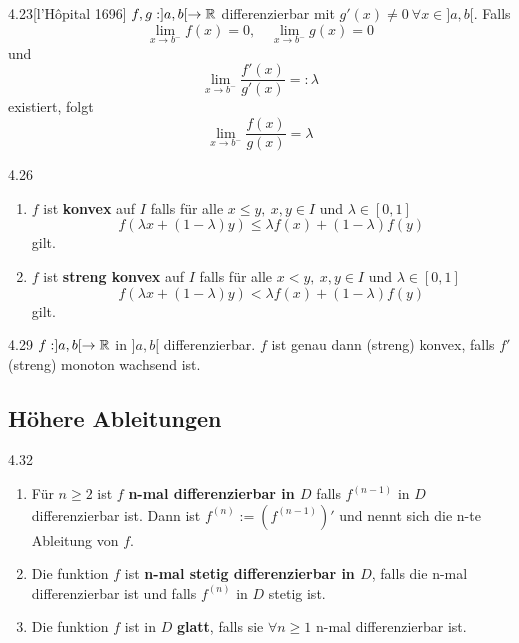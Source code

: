 \begin{satz}{4.23}[l'Hôpital 1696]
    $f,g: ]a, b[ \to \mathbb{R}$ differenzierbar mit $g'(x) \ne 0\ \forall x \in ]a, b[$.
    Falls
    \[ \lim_{x \to b^-} f(x) = 0,\quad \lim_{x \to b^-} g(x) = 0 \]
    und
    \[ \lim_{x \to b^-} \frac{f'(x)}{g'(x)} =: \lambda \]
    existiert, folgt
    \[ \lim_{x \to b^-} \frac{f(x)}{g(x)} = \lambda \]
\end{satz}

\begin{definition}{4.26}
    \begin{enumerate}
        \item $f$ ist \textbf{konvex} auf $I$ falls für alle $x \le y,\ x,y \in I$ und $\lambda \in [0,1]$
              \[ f(\lambda x + (1 - \lambda)y) \le \lambda f(x) + (1 - \lambda)f(y) \]
              gilt.
        \item $f$ ist \textbf{streng konvex} auf $I$ falls für alle $x < y,\ x,y \in I$ und $\lambda \in [0,1]$
              \[ f(\lambda x + (1 - \lambda)y) < \lambda f(x) + (1 - \lambda)f(y) \]
              gilt.
    \end{enumerate}
\end{definition}

\begin{satz}{4.29}
    $f: ]a, b[ \to \mathbb{R}$ in $]a, b[$ differenzierbar. $f$ ist genau dann (streng) konvex, falls $f'$ (streng) monoton wachsend ist.
\end{satz}

\subsection{Höhere Ableitungen}

\begin{definition}{4.32}
    \begin{enumerate}
        \item Für $n \ge 2$ ist $f$ \textbf{n-mal differenzierbar in $D$} falls $f^{(n-1)}$ in $D$ differenzierbar ist.
              Dann ist $f^(n) := (f^{(n - 1)})'$ und nennt sich die n-te Ableitung von $f$.
        \item Die funktion $f$ ist \textbf{n-mal stetig differenzierbar in $D$}, falls die n-mal differenzierbar ist und falls $f^{(n)}$ in $D$ stetig ist.
        \item Die funktion $f$ ist in $D$ \textbf{glatt}, falls sie $\forall n \ge 1$ n-mal differenzierbar ist.
    \end{enumerate}
\end{definition}

